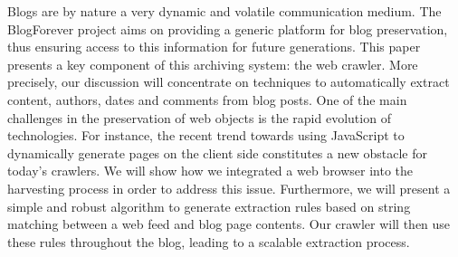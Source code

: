 Blogs are by nature a very dynamic and volatile communication medium. The BlogForever project aims on providing a generic platform for blog preservation, thus ensuring access to this information for future generations. This paper presents a key component of this archiving system: the web crawler. More precisely, our discussion will concentrate on techniques to automatically extract content, authors, dates and comments from blog posts. One of the main challenges in the preservation of web objects is the rapid evolution of technologies. For instance, the recent trend towards using JavaScript to dynamically generate pages on the client side constitutes a new obstacle for today's crawlers. We will show how we integrated a web browser into the harvesting process in order to address this issue. Furthermore, we will present a simple and robust algorithm to generate extraction rules based on string matching between a web feed and blog page contents. Our crawler will then use these rules throughout the blog, leading to a scalable extraction process.
